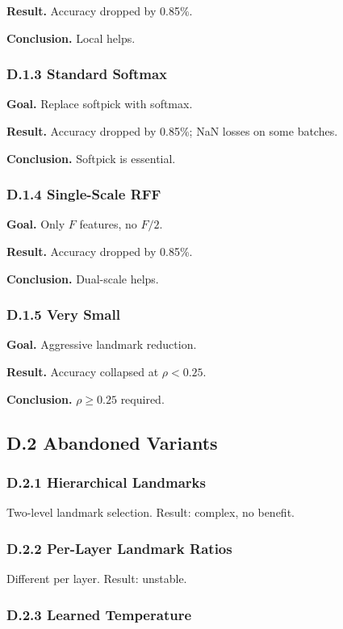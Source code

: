 \textbf{Result.} Accuracy dropped by 0.85\%.

\textbf{Conclusion.} Local helps.

\subsubsection{D.1.3 Standard Softmax}

\textbf{Goal.} Replace softpick with softmax.

\textbf{Result.} Accuracy dropped by 0.85\%; NaN losses on some 
batches.

\textbf{Conclusion.} Softpick is essential.

\subsubsection{D.1.4 Single-Scale RFF}

\textbf{Goal.} Only $F$ features, no $F/2$.

\textbf{Result.} Accuracy dropped by 0.85\%.

\textbf{Conclusion.} Dual-scale helps.

\subsubsection{D.1.5 Very Small}

\textbf{Goal.} Aggressive landmark reduction.

\textbf{Result.} Accuracy collapsed at $\rho < 0.25$.

\textbf{Conclusion.} $\rho \geq 0.25$ required.

\subsection{D.2 Abandoned Variants}

\subsubsection{D.2.1 Hierarchical Landmarks}

Two-level landmark selection. Result: complex, no benefit.

\subsubsection{D.2.2 Per-Layer Landmark Ratios}

Different   per layer. Result: unstable.

\subsubsection{D.2.3 Learned Temperature}

